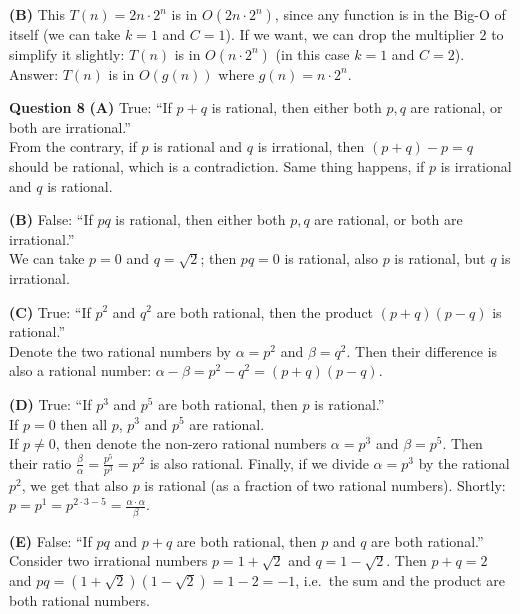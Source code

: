 \documentclass[jou]{apa6}
\begin{document}
{\bf (B)}
This $T(n) = 2n\cdot{}2^n$ is in $O(2n\cdot{}2^n)$, since any function
is in the Big-O of itself (we can take $k = 1$ and $C = 1$). If we want, we can drop the multiplier $2$
to simplify it slightly: $T(n)$ is in $O(n\cdot{}2^n)$ (in this case $k = 1$ and $C = 2$).\\
Answer: $T(n)$ is in $O(g(n))$ where $g(n) = n\cdot{}2^n$.

\vspace{10pt}
{\bf Question 8} 
{\bf (A)} True: ``If $p + q$ is rational, then either both $p,q$ are rational, or both are irrational.''\\
From the contrary, if $p$ is rational and $q$ is irrational, then $(p + q) - p = q$ should be rational, 
which is a contradiction. Same thing happens, if $p$ is irrational and $q$ is rational. 

{\bf (B)} False: ``If $pq$ is rational, then either both $p,q$ are rational, or both are irrational.''\\
We can take $p = 0$ and $q = \sqrt{2}$; then $pq = 0$ is rational, also $p$ is rational, but $q$ is irrational. 
 
{\bf (C)} True: ``If $p^2$ and $q^2$ are both rational, then the product $(p+q)(p-q)$ is rational.''\\
Denote the two rational numbers by $\alpha = p^2$ and $\beta = q^2$. Then their difference is 
also a rational number: $\alpha - \beta = p^2 - q^2 = (p+q)(p-q)$. 

{\bf (D)} True: ``If $p^3$ and $p^5$ are both rational, then $p$ is rational.''\\
If $p = 0$ then all $p$, $p^3$ and $p^5$ are rational.\\
If $p \neq 0$, then denote the non-zero rational numbers $\alpha = p^3$ and $\beta = p^5$. 
Then their ratio $\frac{\beta}{\alpha} = \frac{p^5}{p^3} = p^2$ is also rational. 
Finally, if we divide $\alpha = p^3$ by the rational $p^2$, we get that also $p$ is rational 
(as a fraction of two rational numbers). Shortly: $p = p^1 = p^{2 \cdot 3 - 5} = \frac{ \alpha \cdot \alpha}{\beta}$. 

{\bf (E)} False: ``If $pq$ and $p+q$ are both rational, then $p$ and $q$ are both rational.''\\
Consider two irrational numbers $p = 1 + \sqrt{2}$ and $q = 1 - \sqrt{2}$. Then $p + q = 2$ and
$pq = (1 + \sqrt{2})(1 - \sqrt{2}) = 1 -2 = -1$, i.e.\ the sum and the product are both rational numbers.
\end{document}
